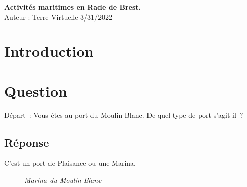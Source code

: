 \documentclass[12pt, report]{article}
\begin{document}
\begin{center}
\begin{minipage}{16cm}

\begin{center}
{\sc\bf\LARGE Activités maritimes  en Rade de Brest. }\\
\vspace{2cm}
Auteur : Terre Virtuelle \hfill 3/31/2022

\end{center}
\end{minipage}
\end{center}

\vspace{2cm}
\section*{Introduction} 

\section{Question}
Départ : Vous êtes au port du Moulin Blanc.  De quel type de port s’agit-il ?
\subsection*{Réponse}
C'est un port de Plaisance ou une Marina.
\begin{center}
\begin{figure}[ht]
\caption{\textit{Marina du Moulin Blanc}}
\end{figure}
\end{center}
\end{document}
